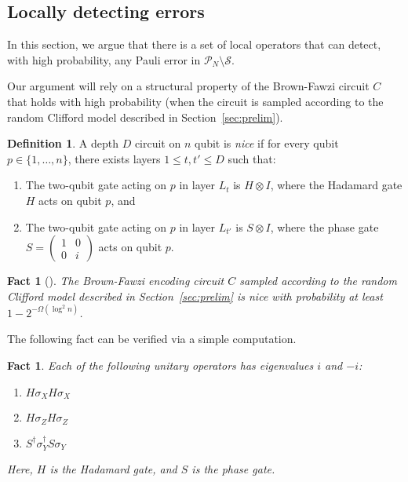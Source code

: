 \documentclass[11pt,letterpaper]{article}
\newtheorem{fact}[theorem]{Fact}
\theoremstyle{definition}
\newtheorem{definition}[theorem]{Definition}
\theoremstyle{remark}
\newcommand{\cP}{\mathcal P}
\newcommand{\cS}{\mathcal S}
\renewcommand{\leq}{\leqslant}
\numberwithin{equation}{section}
\theoremstyle{definition}
\begin{document}
%


\subsection{Locally detecting errors}
In this section, we argue that there is a set of local operators that can detect, with high probability, any Pauli error in $\cP_N \setminus \cS$.

Our argument will rely on a structural property of the Brown-Fawzi circuit $C$ that holds with high probability (when the circuit is sampled according to the random Clifford model described in Section~\ref{sec:prelim}). 
\begin{definition}
A depth $D$ circuit on $n$ qubit is \emph{nice} if for every qubit $p \in \{1,\ldots,n\}$, there exists layers $1 \leq t,t' \leq D$ such that: %
  \begin{enumerate}
    \item The two-qubit gate acting on $p$ in layer $L_t$ is $H \otimes I$, where the Hadamard gate $H$ acts on qubit $p$, and
    
    \item The two-qubit gate acting on $p$ in layer $L_{t'}$ is $S \otimes I$, where the phase gate $S = \begin{pmatrix} 1 & 0 \\ 0 & i \end{pmatrix}$ acts on qubit $p$.
  \end{enumerate}
\end{definition}


\begin{fact}[\cite{brown2013short}]
\label{prop:nice}
  The Brown-Fawzi encoding circuit $C$ sampled according to the random Clifford model described in Section~\ref{sec:prelim} is nice with probability at least $1 - 2^{-\Omega(\log^2 n)}$.
\end{fact}
%
%
%

\noindent The following fact can be verified via a simple computation.
\begin{fact}
\label{prop:HS_real}
%
Each of the following unitary operators has eigenvalues $i$ and $-i$:
\begin{enumerate}
  \item $H \sigma_X H \sigma_X$
  \item $H \sigma_Z H \sigma_Z$
  \item $S^\dagger \sigma_Y^\dagger S \sigma_Y$
\end{enumerate}
Here, $H$ is the Hadamard gate, and $S$ is the phase gate.
\end{fact}
\end{document}
